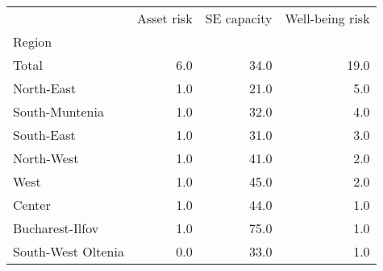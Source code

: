 \begin{tabular}{lrrr}
\toprule
{} &  Asset risk &  SE capacity &  Well-being risk \\
Region             &             &              &                  \\
\midrule
Total              &         6.0 &         34.0 &             19.0 \\
North-East         &         1.0 &         21.0 &              5.0 \\
South-Muntenia     &         1.0 &         32.0 &              4.0 \\
South-East         &         1.0 &         31.0 &              3.0 \\
North-West         &         1.0 &         41.0 &              2.0 \\
West               &         1.0 &         45.0 &              2.0 \\
Center             &         1.0 &         44.0 &              1.0 \\
Bucharest-Ilfov    &         1.0 &         75.0 &              1.0 \\
South-West Oltenia &         0.0 &         33.0 &              1.0 \\
\bottomrule
\end{tabular}
